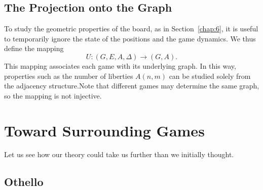 	
	
	\subsection*{The Projection onto the Graph}
	
	To study the geometric properties of the board, as in Section~\ref{chap:6}, it is useful to temporarily ignore the state of the positions and the game dynamics.
	We thus define the mapping
	\[U:(G,E,A,\Delta)\to (G,A).\]
	This mapping associates each game with its underlying graph. In this way, properties such as the number of liberties $A(n,m)$ can be studied solely from the adjacency structure.Note that different games may determine the same graph, so the mapping is not injective.
	
	\section{Toward Surrounding Games}\label{sec_JR}
	
	Let us see how our theory could take us further than we initially thought.
	
	\subsection*{Othello}
	
